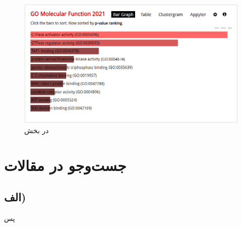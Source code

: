 \documentclass{article}
\begin{document}
\begin{figure}[h!]
	\centering
	\includegraphics[width=0.5\columnwidth]{figs/enrichr-ontologies-mf.jpg}
	\caption{ در بخش }
	\label{fig:enrichr-ontology-mf}
\end{figure}

\section{جست‌و‌جو در مقالات}
\subsection*{الف)}
پس

\clearpage

\begin{thebibliography}{99}
	\begin{latin}
		
	\end{latin}
\end{thebibliography}
\end{document}

